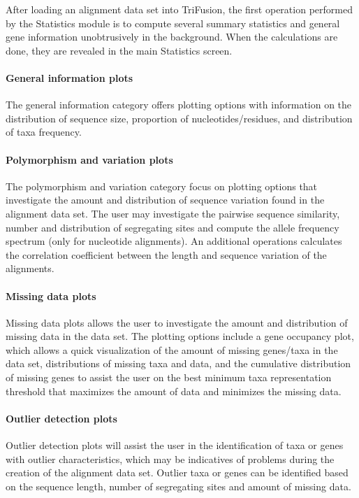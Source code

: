 \documentclass[12pt]{article}
\begin{document}
After loading an alignment data set into TriFusion, the first operation performed by the Statistics module is to compute several summary statistics and general gene information unobtrusively in the background. When the calculations are done, they are revealed in the main Statistics screen. 

\paragraph{General information plots}

The general information category offers plotting options with information on the distribution of sequence size, proportion of nucleotides/residues, and distribution of taxa frequency.

\paragraph{Polymorphism and variation plots}

The polymorphism and variation category focus on plotting options that investigate the amount and distribution of sequence variation found in the alignment data set. The user may investigate the pairwise sequence similarity, number and distribution of segregating sites and compute the allele frequency spectrum (only for nucleotide alignments). An additional operations calculates the correlation coefficient between the length and sequence variation of the alignments.

\paragraph{Missing data plots}

Missing data plots allows the user to investigate the amount and distribution of missing data in the data set. The plotting options include a gene occupancy plot, which allows a quick visualization of the amount of missing genes/taxa in the data set, distributions of missing taxa and data, and the cumulative distribution of missing genes to assist the user on the best minimum taxa representation threshold that maximizes the amount of data and minimizes the missing data.

\paragraph{Outlier detection plots}

Outlier detection plots will assist the user in the identification of taxa or genes with outlier characteristics, which may be indicatives of problems during the creation of the alignment data set. Outlier taxa or genes can be identified based on the sequence length, number of segregating sites and amount of missing data.
\end{document}
